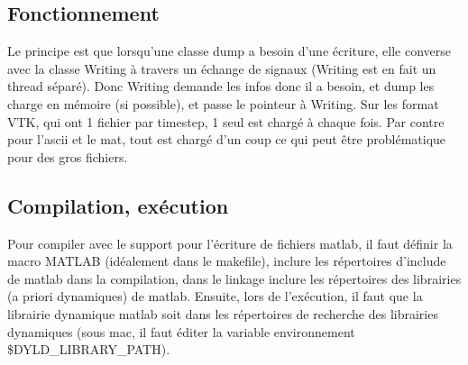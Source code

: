 \documentclass[a4paper,12pt]{article}
\begin{document}
{{{\subsection{Fonctionnement}
Le principe est que lorsqu'une classe dump a besoin d'une \'ecriture, elle converse avec la classe Writing \`a travers un \'echange de signaux (Writing est en fait un thread s\'epar\'e). Donc Writing demande les infos donc il a besoin, et dump les charge en m\'emoire (si possible), et passe le pointeur \`a Writing. Sur les format VTK, qui ont 1 fichier par timestep, 1 seul est charg\'e \`a chaque fois. Par contre pour l'ascii et le mat, tout est charg\'e d'un coup ce qui peut \^etre probl\'ematique pour des gros fichiers.

\subsection{Compilation, ex\'ecution}
Pour compiler avec le support pour l'\'ecriture de fichiers matlab, il faut d\'efinir la macro MATLAB (id\'ealement dans le makefile), inclure les r\'epertoires d'include de matlab dans la compilation, dans le linkage inclure les r\'epertoires des librairies (a priori dynamiques) de matlab.
Ensuite, lors de l'ex\'ecution, il faut que la librairie dynamique matlab soit dans les r\'epertoires de recherche des librairies dynamiques (sous mac, il faut \'editer la variable environnement \$DYLD\_LIBRARY\_PATH).

}}}
\end{document}
